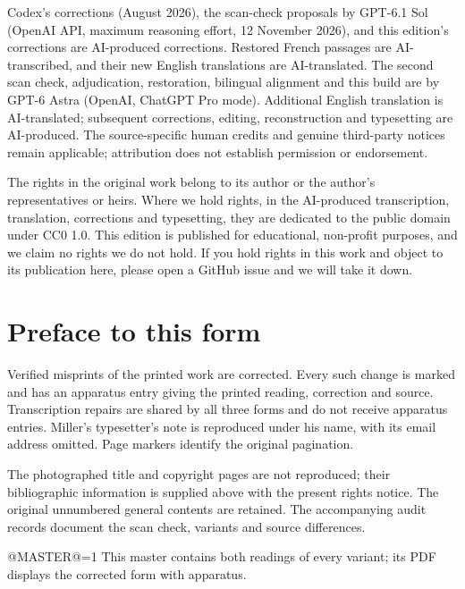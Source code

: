 \documentclass[oneside]{book}
\makeatletter
\theoremstyle{sga-source}
\theoremstyle{sga-source-dash}
\theoremstyle{sga-source-dotdash}
\theoremstyle{sga-source-number-note-dash}
\theoremstyle{sga-source-note-number-dotdash}
\theoremstyle{sga-source-example-dotdash}
\theoremstyle{sga-source-inline-number}
\theoremstyle{sga-source-bare-number}
\theoremstyle{sga-source}
\providecommand\EditionIsMaster{@MASTER@}
\makeatother
\begin{document}
\medskip
Codex’s corrections (August 2026), the scan-check proposals by GPT-6.1 Sol
(OpenAI API, maximum reasoning effort, 12 November 2026), and this edition’s
corrections are AI-produced corrections. Restored French passages are
AI-transcribed, and their new English translations are AI-translated.
The second scan check, adjudication, restoration, bilingual alignment and
this build are by GPT-6 Astra (OpenAI, ChatGPT Pro mode).
Additional English translation is AI-translated; subsequent corrections,
editing, reconstruction and typesetting are AI-produced. The
source-specific human credits and genuine third-party notices remain
applicable; attribution does not establish permission or endorsement.

\medskip
The rights in the original work belong to its author or the author's representatives or heirs.
Where we hold rights, in the AI-produced transcription, translation, corrections and typesetting, they are
dedicated to the public domain under CC0 1.0. This edition is published for educational, non-profit purposes,
and we claim no rights we do not hold. If you hold rights in this work and object to its publication here,
please open a GitHub issue and we will take it down.

\chapter*{Preface to this form}
Verified misprints of the printed work are corrected. Every
such change is marked and has an apparatus entry giving the printed
reading, correction and source. Transcription repairs are shared by all
three forms and do not receive apparatus entries. Miller’s typesetter’s
note is reproduced under his name, with its email address omitted.
Page markers identify the original pagination.

The photographed title and copyright pages are not reproduced; their
bibliographic information is supplied above with the present rights
notice. The original unnumbered general contents are retained. The
accompanying audit records document the scan check, variants and source
differences.

\ifnum\EditionIsMaster=1\relax
This master contains both readings of every variant; its PDF displays the corrected form with apparatus.
\fi

\clearpage

\or
\end{document}

